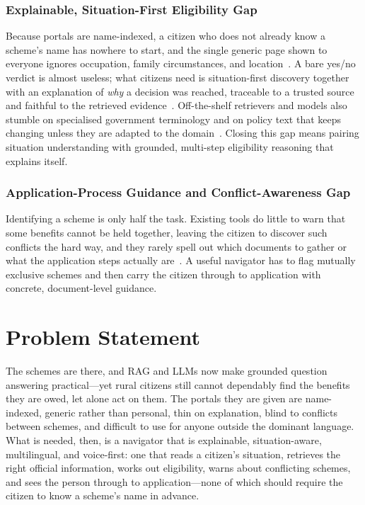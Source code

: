 \documentclass[conference]{IEEEtran}
\begin{document}
\subsubsection{Explainable, Situation-First Eligibility Gap}
Because portals are name-indexed, a citizen who does not already know a scheme's name has nowhere to start, and the single generic page shown to everyone ignores occupation, family circumstances, and location~\cite{zhang2026llm}. A bare yes/no verdict is almost useless; what citizens need is situation-first discovery together with an explanation of \emph{why} a decision was reached, traceable to a trusted source and faithful to the retrieved evidence~\cite{filice2025awf,asai2024selfrag,guha2023legalbench}. Off-the-shelf retrievers and models also stumble on specialised government terminology and on policy text that keeps changing unless they are adapted to the domain~\cite{zhang2024raft,izacard2022contriever,karpukhin2020dpr}. Closing this gap means pairing situation understanding with grounded, multi-step eligibility reasoning that explains itself.

\subsubsection{Application-Process Guidance and Conflict-Awareness Gap}
Identifying a scheme is only half the task. Existing tools do little to warn that some benefits cannot be held together, leaving the citizen to discover such conflicts the hard way, and they rarely spell out which documents to gather or what the application steps actually are~\cite{kumar2025context,zhang2026llm}. A useful navigator has to flag mutually exclusive schemes and then carry the citizen through to application with concrete, document-level guidance.

\section{Problem Statement}
\label{sec:problem}
The schemes are there, and RAG and LLMs now make grounded question answering practical---yet rural citizens still cannot dependably find the benefits they are owed, let alone act on them. The portals they are given are name-indexed, generic rather than personal, thin on explanation, blind to conflicts between schemes, and difficult to use for anyone outside the dominant language. What is needed, then, is a navigator that is explainable, situation-aware, multilingual, and voice-first: one that reads a citizen's situation, retrieves the right official information, works out eligibility, warns about conflicting schemes, and sees the person through to application---none of which should require the citizen to know a scheme's name in advance.
\end{document}
